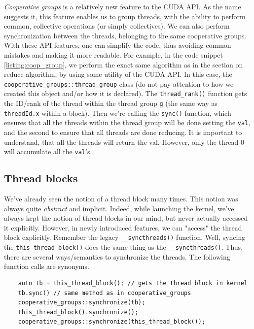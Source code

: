 \textit{Cooperative groups} is a relatively new feature to the CUDA API.
As the name suggests it, this feature enables us to group threads, with the 
ability to perform common, collective operations (or simply collectives). We can also 
perform synchronization between the threads, belonging to the same cooperative groups. 
With these API features, one can simplify the code, thus avoiding common mistakes and making it more readable.
For example, in the code snippet \ref{listing:coop_group}, we perform the exact same algorithm as in the section on reduce algorithm,
by using some utility of the CUDA API. In this case, the \verb|cooperative_groups::thread_group|
class (do not pay attention to how we created this object and/or how it is declared).
The \verb|thread_rank()| function gets the ID/rank of the thread within the thread group \verb|g| (the same way as \verb|threadId.x| within a block). 
Then we're calling the \verb|sync()| function, which ensures that all the threads within the thread group 
will be done setting the \verb|val|, and the second to ensure that all threads are done reducing. It is important to understand, that all the threads will return the val. 
However, only the thread 0 will accumulate all the \verb|val|'s.\cite{blog_2020}

\subsection*{Thread blocks}
We've already seen the notion of a thread block many times. This notion was always quite \textit{abstract} and implicit. Indeed, while launching the kernel, we've 
always kept the notion of thread blocks in our mind, but never actually accessed it explicitly. However, in newly introduced features, we can "access" the 
thread block explicitly. Remember the legacy \verb|__syncthreads()| function. 
Well, syncing the \verb|this_thread_block()| does the same thing as the \verb|__syncthreads()|. Thus, there are several ways/semantics to synchronize the threads. 
The following function calls are synonyms.


\begin{listing}
\begin{verbatim}
    auto tb = this_thread_block(); // gets the thread block in kernel
    tb.sync() // same method as in cooperative_groups
    cooperative_groups::synchronize(tb);
    this_thread_block().synchronize();
    cooperative_groups::synchronize(this_thread_block());
\end{verbatim}
\end{listing}

